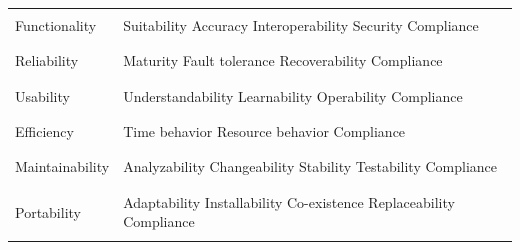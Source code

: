 \begin{longtable}{p{} | p{}}
    \hline
    \endlastfoot
    \\
    Functionality & 
    Suitability \newline
    Accuracy \newline
    Interoperability \newline
    Security \newline
    Compliance \\
    \\
    \hline
    \\
    Reliability & 
    Maturity \newline
    Fault tolerance \newline
    Recoverability \newline
    Compliance \\
    \\
    \hline
    \\
    Usability & 
    Understandability \newline
    Learnability \newline
    Operability \newline
    Compliance \\
    \\
    \hline
    \\
    Efficiency & 
    Time behavior \newline
    Resource behavior \newline
    Compliance \\
    \\
    \hline
    \\
    Maintainability & 
    Analyzability \newline
    Changeability \newline
    Stability \newline
    Testability \newline
    Compliance \\
    \\
    \hline
    \\
    Portability & 
    Adaptability \newline
    Installability \newline
    Co-existence \newline
    Replaceability \newline
    Compliance \\
    \\
    
\end{longtable}


